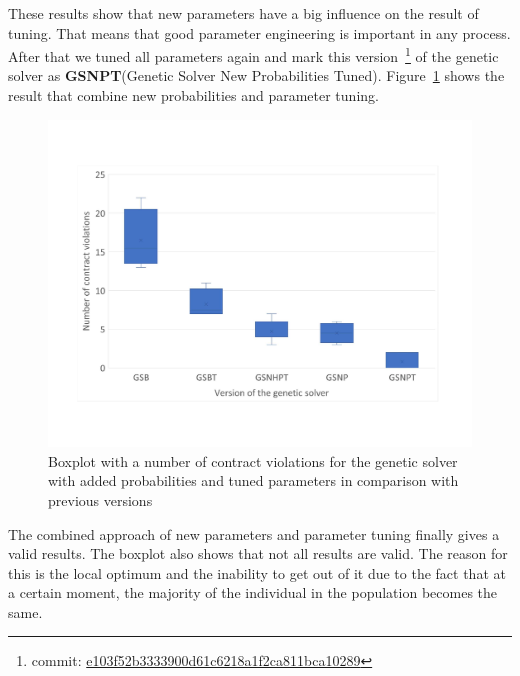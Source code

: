 These results show that new parameters have a big influence on the result of tuning. That means that good parameter engineering is important in any process.
After that we tuned all parameters again and mark this version~\footnote{commit: \href{https://git-st.inf.tu-dresden.de/mquat/mquat2/commit/e103f52b3333900d61c6218a1f2ca811bca10289}{e103f52b3333900d61c6218a1f2ca811bca10289}} of the genetic solver as \textbf{GSNPT}(Genetic Solver New Probabilities Tuned).
Figure~\ref{fig:boxplotsolverNewParametersTuning} shows the result that combine new probabilities and parameter tuning.
\begin{figure}
	\centering
	\includegraphics[width=\textwidth]{images/BoxPlotSolverNewParametersTuning.pdf}
	\caption[Boxplot with a number of contract violations for the genetic solver with added probabilities and tuned parameters in comparison with previous versions]{Boxplot with a number of contract violations for the genetic solver with added probabilities and tuned parameters in comparison with previous versions}
	\label{fig:boxplotsolverNewParametersTuning}
\end{figure}

The combined approach of new parameters and parameter tuning finally gives a valid results. The boxplot also shows that not all results are valid. The reason for this is the local optimum and the inability to get out of it due to the fact that at a certain moment, the majority of the individual in the population becomes the same. 

